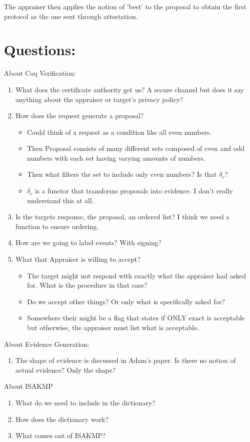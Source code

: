 \documentclass[10pt]{report}
\newcommand{\squash}{\itemsep=0pt\parskip=0pt}
\begin{document}
The appraiser then applies the notion of 'best' to the proposal to obtain
the first protocol as the one sent through attestation.

\chapter{Questions:}

About Coq Verification:

\begin{enumerate}
  \item What does the certificate authority get us? A secure channel but 
        does it say anything about the appraiser or target's
        privacy policy?
  \item How does the request generate a proposal? 
  \begin{itemize}
    \item Could think of a request as a condition like all even numbers.
    \item Then Proposal consists of many different sets composed of even
          and odd numbers with each set having varying amounts of numbers.
    \item Then what filters the set to include only even numbers?
          Is that $\delta_c$?
    \item $\delta_c$ is a functor that transforms proposals into evidence.
          I don't really understand this at all.  
  \end{itemize}
  \item Is the targets response, the proposal, an ordered list?
        I think we need a function to ensure ordering.
  \item How are we going to label events? With signing?
  \item What that Appraiser is willing to accept?
	\begin{itemize}
	\squash
	\item The target might not respond with exactly what the appraiser
          had asked for. What is the procedure in that case?
	\item Do we accept other things? Or only what is specifically asked for?
	\item Somewhere their might be a flag that states if ONLY exact is
          acceptable but otherwise, the appraiser must list what is acceptable. 
	\end{itemize}
\end{enumerate}

About Evidence Generation:

\begin{enumerate}
  \item The shape of evidence is discussed in Adam's paper. 
		Is there no notion of actual evidence? Only the shape?
\end{enumerate}

About ISAKMP

\begin{enumerate}
\item What do we need to include in the dictionary?
\item How does the dictionary work?
\item What comes out of ISAKMP?

\end{enumerate}
\end{document}
